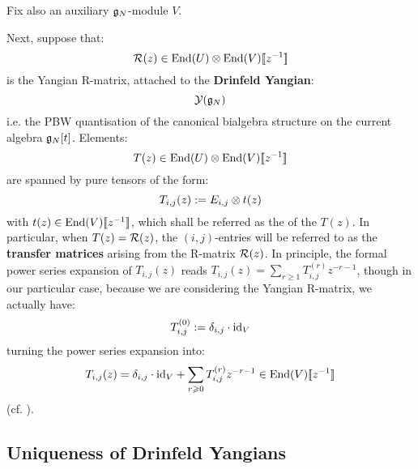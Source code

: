         Fix also an auxiliary $\mathfrak{g}_N$-module $V$.
        
        Next, suppose that:
            $$\calR(z) \in \End(U) \tensor \End(V)[\![z^{-1}]\!]$$
        is the Yangian R-matrix, attached to the \textbf{Drinfeld Yangian}:
            $$\mathcal{Y}(\mathfrak{g}_N)$$
        i.e. the PBW quantisation of the canonical bialgebra structure on the current algebra $\mathfrak{g}_N[t]$. Elements:
            $$T(z) \in \End(U) \tensor \End(V)[\![z^{-1}]\!]$$
        are spanned by pure tensors of the form:
            $$T_{i, j}(z) := E_{i, j} \tensor t(z)$$
        with $t(z) \in \mathrm{End}(V)[\![z^{-1}]\!]$, which shall be referred as the  of the  $T(z)$. In particular, when $T(z) = \mathcal{R}(z)$, the $(i, j)$-entries will be referred to as the \textbf{transfer matrices} arising from the R-matrix $\mathcal{R}(z)$. In principle, the formal power series expansion of $T_{i, j}(z)$ reads $T_{i, j}(z) = \sum_{r \geq 1} T_{i, j}^{(r)} z^{-r - 1}$, though in our particular case, because we are considering the Yangian R-matrix, we actually have:
            $$T_{i, j}^{(0)} := \delta_{i, j} \cdot \mathrm{id}_V$$
        turning the power series expansion into:
            \begin{equation} \label{equation: untwisted_yangian_transfer_matrices}
                T_{i, j}(z) = \delta_{i, j} \cdot \mathrm{id}_V + \sum_{r \geqslant 0} T_{i, j}^{(r)} z^{-r - 1} \in \mathrm{End}(V)[\![z^{-1}]\!]
            \end{equation}
        (cf. \cite[Subsection 11.3.1]{etingof_schiffmann_lectures_on_quantum_groups}).

    \subsection{Uniqueness of Drinfeld Yangians}